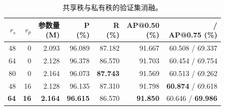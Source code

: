 \begin{table}[!t]
\caption{共享秩与私有秩的验证集消融。\label{tab:rank}}
\centering\srpatablesetup
\begin{tabular}{rrrrrrr}\toprule
$r_s$ & $r_p$ & \shortstack{参数量\\(M)} & \shortstack{P\\(\%)} & \shortstack{R\\(\%)} & \shortstack{AP@0.50\\(\%)} & \shortstack{\mapall{}/\\AP@0.75 (\%)}\\\midrule
48 & 0  & 2.093 & 96.089 & 87.182 & 91.667 & 60.508 / 69.337\\
64 & 0  & 2.128 & 96.378 & 86.570 & 91.703 & 60.454 / 69.754\\
80 & 0  & 2.164 & 96.073 & \textbf{87.743} & 91.569 & 60.513 / 69.262\\
48 & 16 & 2.128 & 96.135 & 87.310 & 91.798 & \textbf{60.874} / 69.618\\
\textbf{64} & \textbf{16} & \textbf{2.164} & \textbf{96.615} & 86.570 & \textbf{91.850} & 60.646 / \textbf{69.986}\\\bottomrule
\end{tabular}
\end{table}
